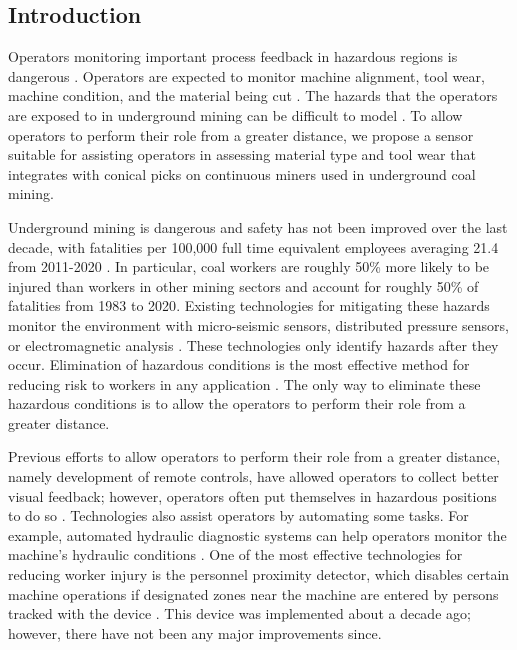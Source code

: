 \subsection{Introduction}\label{sec1}

Operators monitoring important process feedback in hazardous regions is dangerous \cite{jobes12}.
Operators are expected to monitor machine alignment, tool wear, machine condition, and the material being cut \cite{sanders81}.
The hazards that the operators are exposed to in underground mining can be difficult to model \cite{JiangYaodong2017Arom}.
To allow operators to perform their role from a greater distance, 
 we propose a sensor suitable for assisting operators in assessing material type and tool wear that integrates
 with conical picks on continuous miners used in underground coal mining.

Underground mining is dangerous and safety has not been improved over the last decade, 
 with fatalities per 100,000 full time equivalent employees averaging 21.4 from 2011-2020 \cite{nioshdata}.
In particular, coal workers are roughly 50\%
 more likely to be injured than workers in other mining sectors and
 account for roughly 50\% of fatalities from 1983 to 2020\cite{nioshdata}.
Existing technologies for mitigating these hazards monitor the environment 
 with micro-seismic sensors, distributed pressure sensors, or electromagnetic analysis \cite{JiangYaodong2017Arom}.
These technologies only identify hazards after they occur. 
Elimination of hazardous conditions is the most effective method for reducing risk to workers in any application \cite{niosh_2015}.
The only way to eliminate these hazardous conditions is to allow the operators to perform their role from a greater distance.

Previous efforts to allow operators to perform their role from a greater distance,
 namely development of remote controls, have allowed operators to 
 collect better visual feedback; however, 
 operators often put themselves in hazardous positions to do so \cite{bartels09}.
Technologies also assist operators by automating some tasks. 
For example, automated hydraulic diagnostic systems can help operators 
 monitor the machine's hydraulic conditions \cite{mitchell91}.
One of the most effective technologies for reducing worker injury is the personnel proximity detector, 
 which disables certain machine operations if designated zones near the machine are entered 
 by persons tracked with the device \cite{bissert16}. 
This device was implemented about a decade ago; however, there have not been 
 any major improvements since.

